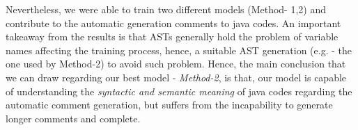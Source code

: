 \documentclass[a4paper,10pt]{article}
\theoremstyle{plain}
\theoremstyle{definition}
\begin{document}
\begin{multicols*}{2}
Nevertheless, we were able to train two different models (Method- 1,2) and contribute to the automatic generation comments to java codes. An important takeaway from the results is that ASTs generally hold the problem of variable names affecting the training process, hence, a suitable AST generation (e.g. \cite{ZHOU2019328} - the one used by Method-2) to avoid such problem. Hence, the main conclusion that we can draw regarding our best model - \textit{Method-2}, is that, our model is capable of understanding the \textit{syntactic and semantic meaning} of java codes regarding the automatic comment generation, but suffers from the incapability to generate longer comments and complete. 



\end{multicols*}


\newpage
\end{document}
